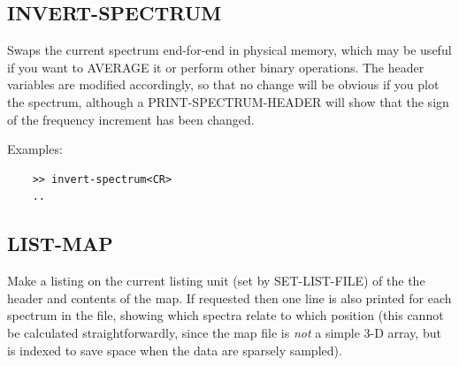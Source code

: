 \documentclass[11pt,twoside]{report}
\begin{document}
\subsection{INVERT-SPECTRUM} 

Swaps the current spectrum end-for-end in physical memory, which may be
useful if you want to AVERAGE it or perform other binary operations.
The header variables are modified accordingly, so that no change will be
obvious if you plot the spectrum, although a PRINT-SPECTRUM-HEADER will
show that the sign of the frequency increment has been changed.

Examples:
\begin{verbatim}
    >> invert-spectrum<CR>
    ..
\end{verbatim}

\subsection{LIST-MAP} 

Make a listing on the current listing unit (set by SET-LIST-FILE) of the
the header and contents of the map. If requested then one line is also printed
for each spectrum in the file, showing which spectra relate to which position
(this cannot be calculated straightforwardly, since the map file is {\em not}
a simple 3-D array, but is indexed to save space when the data are
sparsely sampled).
\end{document}
